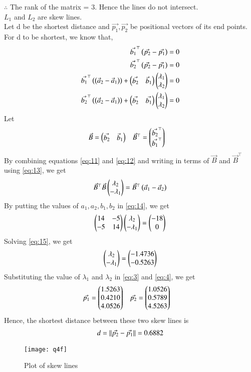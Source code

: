 \documentclass[journal,12pt,twocolumn]{IEEEtran}
\begin{document}
$\therefore$ The rank of the matrix = 3. Hence the lines do not intersect. \\
$L_{1}$ and $L_{2}$ are skew lines. \\
Let d be the shortest distance and $\Vec{p_{1}}, \Vec{p_{2}}$ be positional vectors of its end points.
For d to be shortest, we know that,
\begin{align}
    \label{eq:9}
    \Vec{b_{1}}^\top\left(\Vec{p_{2}}-\Vec{p_{1}}\right)=0\\
    \label{eq:10}
     \Vec{b_{2}}^\top\left(\Vec{p_{2}}-\Vec{p_{1}}\right)=0\\
     \label{eq:11}
     \Vec{b_{1}}^\top\left(\left(\Vec{a}_{2} - \Vec{a}_{1}\right)\right)+\begin{pmatrix}\Vec{b_{2}} & \Vec{b}_{1}\end{pmatrix}\begin{pmatrix}\lambda_{1} \\ \lambda_{2}\end{pmatrix}=0\\
     \label{eq:12}
     \Vec{b_{2}}^\top\left(\left(\Vec{a}_{2} - \Vec{a}_{1}\right)\right)+\begin{pmatrix}\Vec{b_{2}} & \Vec{b_{1}}\end{pmatrix}\begin{pmatrix}\lambda_{1} \\ \lambda_{2}\end{pmatrix}=0
\end{align}
Let 
\begin{align}
\label{eq:13}
    \Vec{B}&=\begin{pmatrix}\Vec{b_{2}} & \Vec{b}_{1}\end{pmatrix} & \Vec{B}^\top&=\begin{pmatrix}\Vec{b_{2}}^\top \\ \Vec{b_{1}}^\top\end{pmatrix}
\end{align}
By combining equations \eqref{eq:11} and \eqref{eq:12} and writing in terms of $\Vec{B}$ and $\Vec{B}^\top$ using \eqref{eq:13}, we get
\begin{align}
    \label{eq:14}
    \Vec{B}^\top\Vec{B}\begin{pmatrix}\lambda_{2} \\ -\lambda_{1}\end{pmatrix}= \Vec{B}^\top\left(\Vec{a}_{1} - \Vec{a}_{2}\right)
\end{align}
By putting the values of $a_{1},a_{2},b_{1},b_{2}$ in \eqref{eq:14}, we get
\begin{align}
    \label{eq:15}
    \begin{pmatrix}14 & -5 \\ -5 & 14\end{pmatrix}\begin{pmatrix}\lambda_{2} \\ -\lambda_{1}\end{pmatrix}=\begin{pmatrix}-18 \\ 0\end{pmatrix}
\end{align}
Solving \eqref{eq:15}, we get
\begin{align}
    \label{eq:16}
    \begin{pmatrix}\lambda_{2} \\ -\lambda_{1}\end{pmatrix}=\begin{pmatrix}-1.4736 \\ -0.5263\end{pmatrix}
\end{align}
Substituting the value of $\lambda_{1}$ and $\lambda_{2}$ in \eqref{eq:3} and \eqref{eq:4}, we get
\begin{align}
    \label{eq:17}
    \Vec{p_{1}} &= \begin{pmatrix}1.5263\\ 0.4210 \\ 4.0526 \end{pmatrix}   &    \Vec{p_{2}}&=\begin{pmatrix} 1.0526\\0.5789\\4.5263\end{pmatrix}
\end{align}
Hence, the shortest distance between these two skew lines is
\begin{align}
    \label{eq:18}
    d = \lVert\Vec{p_{2}}-\Vec{p_{1}}\rVert = 0.6882
\end{align}
\begin{figure}[h]
\centering
\texttt{[image: q4f]}
\caption{Plot of skew lines}
\end{figure}
\end{document}
